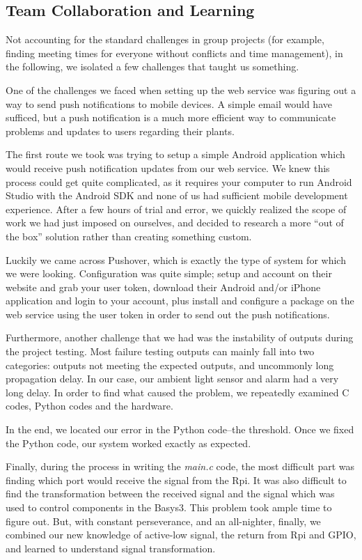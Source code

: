\documentclass[a4paper]{article}
\begin{document}
\subsection{Team Collaboration and Learning}

Not accounting for the standard challenges in group projects (for example, finding meeting times for everyone without conflicts and time management), in the following, we isolated a few challenges that taught us something.

\label{sec:pushover}
One of the challenges we faced when setting up the web service was figuring out a way to send push notifications to mobile devices. A simple email would have sufficed, but a push notification is a much more efficient way to communicate problems and updates to users regarding their plants.

The first route we took was trying to setup a simple Android application which would receive push notification updates from our web service. We knew this process could get quite complicated, as it requires your computer to run Android Studio with the Android SDK and none of us had sufficient mobile development experience. After a few hours of trial and error, we quickly realized the scope of work we had just imposed on ourselves, and decided to research a more “out of the box” solution rather than creating something custom.

Luckily we came across Pushover, which is exactly the type of system for which we were looking. Configuration was quite simple; setup and account on their website and grab your user token, download their Android and/or iPhone application and login to your account, plus install and configure a package on the web service using the user token in order to send out the push notifications.

Furthermore, another challenge that we had was the instability of outputs during the project testing. Most failure testing outputs can mainly fall into two categories: outputs not meeting the expected outputs,  and uncommonly long propagation delay. In our case, our ambient light sensor and alarm had a very long delay. In order to find what caused the problem, we repeatedly examined C codes, Python codes and the hardware. 

In the end, we located our error in the Python code--the threshold. Once we fixed the Python code, our system worked exactly as expected.

Finally, during the process in writing the {\it main.c} code, the most difficult part was finding which port would receive the signal from the Rpi. It was also difficult to find the transformation between the received signal and the signal which was used to control components in the Basys3. This problem took ample time to figure out. But, with constant perseverance, and an all-nighter, finally, we combined our new knowledge of active-low signal, the return from Rpi and GPIO, and learned to understand signal transformation.
\end{document}

